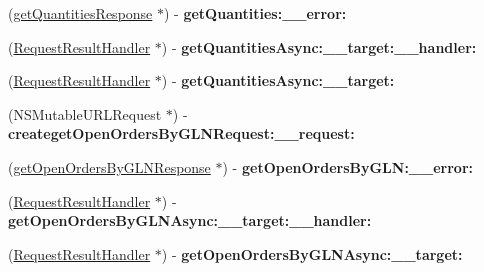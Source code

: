 \begin{DoxyCompactItemize}
\item 
\hypertarget{interface_supply_chain_service_port_binding_a192b444a92d66da49d74564acd9de635}{}(\hyperlink{interfaceget_quantities_response}{get\+Quantities\+Response} $\ast$) -\/ {\bfseries get\+Quantities\+:\+\_\+\+\_\+error\+:}\label{interface_supply_chain_service_port_binding_a192b444a92d66da49d74564acd9de635}

\item 
\hypertarget{interface_supply_chain_service_port_binding_a0f33051401b2353f7e0423e15b89e713}{}(\hyperlink{interface_request_result_handler}{Request\+Result\+Handler} $\ast$) -\/ {\bfseries get\+Quantities\+Async\+:\+\_\+\+\_\+target\+:\+\_\+\+\_\+handler\+:}\label{interface_supply_chain_service_port_binding_a0f33051401b2353f7e0423e15b89e713}

\item 
\hypertarget{interface_supply_chain_service_port_binding_a6e0590fe1b45857cefb00e0095a89cc0}{}(\hyperlink{interface_request_result_handler}{Request\+Result\+Handler} $\ast$) -\/ {\bfseries get\+Quantities\+Async\+:\+\_\+\+\_\+target\+:}\label{interface_supply_chain_service_port_binding_a6e0590fe1b45857cefb00e0095a89cc0}

\item 
\hypertarget{interface_supply_chain_service_port_binding_aa934a183427a1065c470a496c78b3088}{}(N\+S\+Mutable\+U\+R\+L\+Request $\ast$) -\/ {\bfseries createget\+Open\+Orders\+By\+G\+L\+N\+Request\+:\+\_\+\+\_\+request\+:}\label{interface_supply_chain_service_port_binding_aa934a183427a1065c470a496c78b3088}

\item 
\hypertarget{interface_supply_chain_service_port_binding_a6304b08408153b55f561810a6780043d}{}(\hyperlink{interfaceget_open_orders_by_g_l_n_response}{get\+Open\+Orders\+By\+G\+L\+N\+Response} $\ast$) -\/ {\bfseries get\+Open\+Orders\+By\+G\+L\+N\+:\+\_\+\+\_\+error\+:}\label{interface_supply_chain_service_port_binding_a6304b08408153b55f561810a6780043d}

\item 
\hypertarget{interface_supply_chain_service_port_binding_ad5034e9d3a023ba419bb8eb381c29450}{}(\hyperlink{interface_request_result_handler}{Request\+Result\+Handler} $\ast$) -\/ {\bfseries get\+Open\+Orders\+By\+G\+L\+N\+Async\+:\+\_\+\+\_\+target\+:\+\_\+\+\_\+handler\+:}\label{interface_supply_chain_service_port_binding_ad5034e9d3a023ba419bb8eb381c29450}

\item 
\hypertarget{interface_supply_chain_service_port_binding_ab7e54aada06df2131811c5583d567a36}{}(\hyperlink{interface_request_result_handler}{Request\+Result\+Handler} $\ast$) -\/ {\bfseries get\+Open\+Orders\+By\+G\+L\+N\+Async\+:\+\_\+\+\_\+target\+:}\label{interface_supply_chain_service_port_binding_ab7e54aada06df2131811c5583d567a36}


\end{DoxyCompactItemize}
